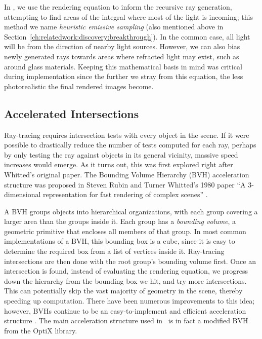 In \name, we use the rendering equation to inform the recursive ray generation, attempting to find areas of the integral where most of the light is incoming; this method we name {\it heuristic emissive sampling} (also mentioned above in Section~\ref{ch:relatedwork:discovery:breakthrough}).
In the common case, all light will be from the direction of nearby light sources.
However, we can also bias newly generated rays towards areas where refracted light may exist, such as around glass materials.
Keeping this mathematical basis in mind was critical during implementation since the further we stray from this equation, the less photorealistic the final rendered images become.



\subsection{Accelerated Intersections}

Ray-tracing requires intersection tests with every object in the scene.
If it were possible to drastically reduce the number of tests computed for each ray, perhaps by only testing the ray against objects in its general vicinity, massive speed increases would emerge.
As it turns out, this was first explored right after Whitted's original paper.
The Bounding Volume Hierarchy (BVH) acceleration structure was proposed in Steven Rubin and Turner Whitted's 1980 paper ``A 3-dimensional representation for fast rendering of complex scenes'' \cite{rubin1980}.

A BVH groups objects into hierarchical organizations, with each group covering a larger area than the groups inside it.
Each group has a {\it bounding volume}, a geometric primitive that encloses all members of that group.
In most common implementations of a BVH, this bounding box is a cube, since it is easy to determine the required box from a list of vertices inside it.
Ray-tracing intersections are then done with the root group's bounding volume first.
Once an intersection is found, instead of evaluating the rendering equation, we progress down the hierarchy from the bounding box we hit, and try more intersections.
This can potentially skip the vast majority of geometry in the scene, thereby speeding up computation.
There have been numerous improvements to this idea; however, BVHs continue to be an easy-to-implement and efficient acceleration structure \cite{prunier2017bvh}.
The main acceleration structure used in \name\ is in fact a modified BVH from the OptiX library.

